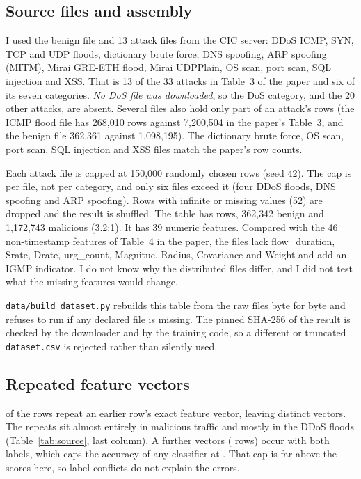 \documentclass[conference]{IEEEtran}
\begin{document}
\subsection{Source files and assembly}
I used the benign file and 13 attack files from the CIC server: DDoS ICMP, SYN, TCP and UDP floods, dictionary brute force, DNS spoofing, ARP spoofing (MITM), Mirai GRE-ETH flood, Mirai UDPPlain, OS scan, port scan, SQL injection and XSS. That is 13 of the 33 attacks in Table~3 of the paper and six of its seven categories. \emph{No DoS file was downloaded}, so the DoS category, and the 20 other attacks, are absent. Several files also hold only part of an attack's rows (the ICMP flood file has 268{,}010 rows against 7{,}200{,}504 in the paper's Table~3, and the benign file 362{,}361 against 1{,}098{,}195). The dictionary brute force, OS scan, port scan, SQL injection and XSS files match the paper's row counts.

Each attack file is capped at 150{,}000 randomly chosen rows (seed 42). The cap is per file, not per category, and only six files exceed it (four DDoS floods, DNS spoofing and ARP spoofing). Rows with infinite or missing values (52) are dropped and the result is shuffled. The table has \DupRows{} rows, 362{,}342 benign and 1{,}172{,}743 malicious (3.2:1). It has 39 numeric features. Compared with the 46 non-timestamp features of Table~4 in the paper, the files lack flow\_duration, Srate, Drate, urg\_count, Magnitue, Radius, Covariance and Weight and add an IGMP indicator. I do not know why the distributed files differ, and I did not test what the missing features would change.

\texttt{data/build\_dataset.py} rebuilds this table from the raw files byte for byte and refuses to run if any declared file is missing. The pinned SHA-256 of the result is checked by the downloader and by the training code, so a different or truncated \texttt{dataset.csv} is rejected rather than silently used.

\subsection{Repeated feature vectors}
\DupRepeats{} of the \DupRows{} rows repeat an earlier row's exact feature vector, leaving \DupDistinct{} distinct vectors. The repeats sit almost entirely in malicious traffic and mostly in the DDoS floods (Table~\ref{tab:source}, last column). A further \DupConflictVecs{} vectors (\DupConflictRows{} rows) occur with both labels, which caps the accuracy of any classifier at \DupAccBound. That cap is far above the scores here, so label conflicts do not explain the errors.
\end{document}
